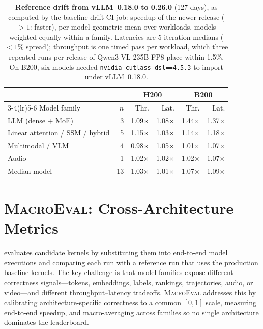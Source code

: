 \begin{table}[t]
  \centering
  \caption{\textbf{Reference drift from vLLM~0.18.0 to 0.26.0} (127 days), as computed by the baseline-drift CI job: speedup of the newer release (${>}1$: faster), per-model geometric mean over workloads, models weighted equally within a family.
  Latencies are 5-iteration medians (${<}1\%$ spread); throughput is one timed pass per workload, which three repeated runs per release of Qwen3-VL-235B-FP8 place within 1.5\%.
  On B200, six models needed \texttt{nvidia-cutlass-dsl==4.5.3} to import under vLLM~0.18.0.}
  \label{fastkernels:tab:drift}
  \small
\begin{tabular}{@{}lr rr rr@{}}
\toprule
 & & \multicolumn{2}{c}{\textbf{H200}} & \multicolumn{2}{c}{\textbf{B200}} \\
\cmidrule(lr){3-4}\cmidrule(lr){5-6}
Model family & $n$ & Thr. & Lat. & Thr. & Lat. \\
\midrule
LLM (dense + MoE) & 3 & 1.09$\times$ & 1.08$\times$ & 1.44$\times$ & 1.37$\times$ \\
Linear attention / SSM / hybrid & 5 & 1.15$\times$ & 1.03$\times$ & 1.14$\times$ & 1.18$\times$ \\
Multimodal / VLM & 4 & 0.98$\times$ & 1.05$\times$ & 1.01$\times$ & 1.07$\times$ \\
Audio & 1 & 1.02$\times$ & 1.02$\times$ & 1.02$\times$ & 1.07$\times$ \\
\midrule
Median model & 13 & 1.03$\times$ & 1.01$\times$ & 1.07$\times$ & 1.09$\times$ \\
\bottomrule
\end{tabular}
\end{table}

\section{\textsc{MacroEval}: Cross-Architecture Metrics}
\label{fastkernels:sec:metrics}

\FastKernels evaluates candidate kernels by substituting them into end-to-end model executions and comparing each run with a reference run that uses the production baseline kernels.
The key challenge is that model families expose different correctness signals---tokens, embeddings, labels, rankings, trajectories, audio, or video---and different throughput--latency tradeoffs.
\textsc{MacroEval} addresses this by calibrating architecture-specific correctness to a common $[0,1]$ scale, measuring end-to-end speedup, and macro-averaging across families so no single architecture dominates the leaderboard.

